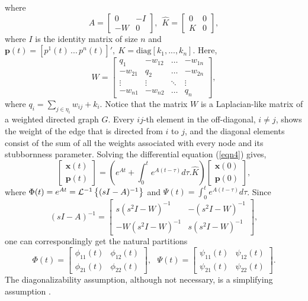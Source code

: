 \documentclass[10pt, conference, compsocconf]{IEEEtran}
\begin{document}
where
\[
	A = \left[ \begin{array}{cc} 0&-I \\ -W&0 \end{array} \right], \ \
	\hat{K} = \left[ \begin{array}{cc} 0&0 \\ K&0 \end{array} \right],
\]
where $I$ is the identity matrix of size $n$ and
$\mathbf{p}(t)=[p^1(t)\,...\,p^n(t)]', \ K=\mbox{diag} \left[k_1, ... , k_n\right]$. Here,
\[ W = \left [ \begin{array}{cccc}
q_1 & -w_{12} & \dots & -w_{1n} \\
-w_{21} & q_2   & \dots & -w_{2n}\\ 
\vdots & \vdots & \ddots & \vdots \\
-w_{n1} & -w_{n2} & \dots & q_n
\end{array} \right] , \]
where $q_i = \sum_{j\in \eta_i} w_{ij} + k_i$.
Notice that the matrix $W$ is a Laplacian-like matrix of a weighted directed graph $G$. Every $ij$-th element in the off-diagonal, $i\neq j$, shows the weight of the edge that is directed from $i$ to $j$, and the diagonal elements consist of the sum of all the weights associated with every node and its stubbornness parameter.
Solving the differential equation (\ref{eqn4}) gives,
\begin{equation} \label{eqn5}
\left[ \begin{array}{c}
\mathbf{x}(t) \\ \mathbf{p}(t)
\end{array} \right] = \left( e^{At} + \int_0^t e^{A(t-\tau)} d\tau . \hat{K} \right) \left[ \begin{array}{c}
\mathbf{x}(0) \\ \mathbf{p}(0)
\end{array} \right],
\end{equation}
where $\Phi(t) = e^{At}={\cal{L}}^{-1} \left\lbrace(sI-A)^{-1} \right\rbrace$ and $\Psi(t) = \int_0^t e^{A(t-\tau)} d\tau$. Since
\begin{equation} \label{lap}
(sI-A)^{-1} = \left[ \begin{array}{ll}
s(s^2 I - W)^{-1} & -(s^2 I - W)^{-1} \\
-W(s^2 I - W)^{-1} & s (s^2 I - W)^{-1}
\end{array} \right],
\end{equation}
one can correspondingly get the natural partitions
\[ \Phi(t) = \left[ \begin{array}{cc} \phi_{11}(t) & \phi_{12}(t) \\
\phi_{21}(t) & \phi_{22}(t) \end{array}  \right],  \ \ \
\Psi(t) = \left[ \begin{array}{cc} \psi_{11}(t) & \psi_{12}(t) \\
\psi_{21}(t) & \psi_{22}(t) \end{array}  \right].
\]
The diagonalizability assumption, although not necessary, is a simplifying assumption .
\end{document}
